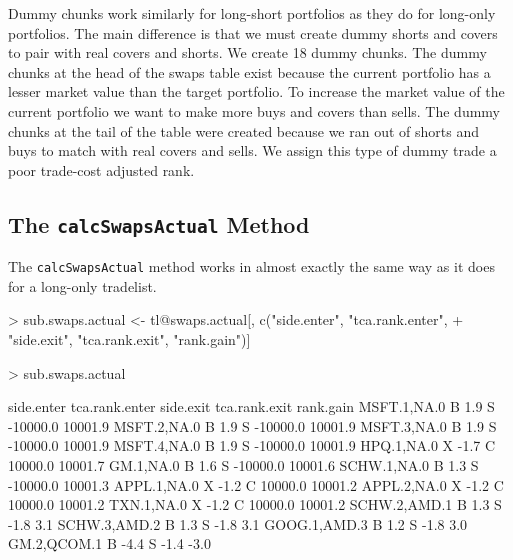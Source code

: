 \documentclass{article}
\begin{document}
Dummy chunks work similarly for long-short portfolios as they do for
long-only portfolios.  The main difference is that we must create
dummy shorts and covers to pair with real covers and shorts.  We
create 18 dummy chunks.
The dummy chunks at the head of the swaps table exist because the
current portfolio has a lesser market value than the target portfolio.
To increase the market value of the current portfolio we want to make
more buys and covers than sells.  The dummy chunks at the tail of the
table were created because we ran out of shorts and buys to match with
real covers and sells.  We assign this type of dummy trade a poor
trade-cost adjusted rank.

\subsection{The \texttt{calcSwapsActual} Method}

The \texttt{calcSwapsActual} method works in almost exactly the same
way as it does for a long-only tradelist.

\begin{Schunk}
\begin{Sinput}
> sub.swaps.actual <- tl@swaps.actual[, c("side.enter", "tca.rank.enter", 
+     "side.exit", "tca.rank.exit", "rank.gain")]
\end{Sinput}
\end{Schunk}

\begin{Schunk}
\begin{Sinput}
> sub.swaps.actual
\end{Sinput}
\begin{Soutput}
             side.enter tca.rank.enter side.exit tca.rank.exit rank.gain
MSFT.1,NA.0           B            1.9         S      -10000.0   10001.9
MSFT.2,NA.0           B            1.9         S      -10000.0   10001.9
MSFT.3,NA.0           B            1.9         S      -10000.0   10001.9
MSFT.4,NA.0           B            1.9         S      -10000.0   10001.9
HPQ.1,NA.0            X           -1.7         C       10000.0   10001.7
GM.1,NA.0             B            1.6         S      -10000.0   10001.6
SCHW.1,NA.0           B            1.3         S      -10000.0   10001.3
APPL.1,NA.0           X           -1.2         C       10000.0   10001.2
APPL.2,NA.0           X           -1.2         C       10000.0   10001.2
TXN.1,NA.0            X           -1.2         C       10000.0   10001.2
SCHW.2,AMD.1          B            1.3         S          -1.8       3.1
SCHW.3,AMD.2          B            1.3         S          -1.8       3.1
GOOG.1,AMD.3          B            1.2         S          -1.8       3.0
GM.2,QCOM.1           B           -4.4         S          -1.4      -3.0
\end{Soutput}
\end{Schunk}
\end{document}
